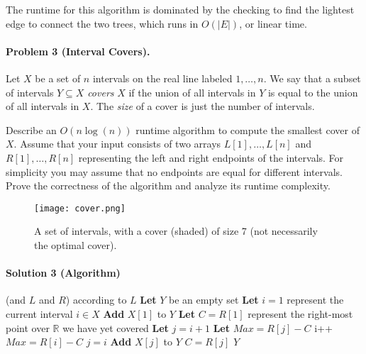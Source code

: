 \documentclass[11pt]{article}
\begin{document}
The runtime for this algorithm is dominated by the checking to find the lightest
edge to connect the two trees, which runs in $O(|E|)$, or linear time.


\newpage
\paragraph{Problem 3 (Interval Covers).} Let \(X\) be a set of \(n\) intervals on the real line labeled $1, \dots, n$. We say that a subset of intervals \(Y \subseteq X\) \textit{covers} \(X\) if the union of all intervals in \(Y\) is equal to the union of all intervals in \(X\). The \textit{size} of a cover is just the number of intervals.

Describe an $O(n \log(n))$ runtime algorithm to compute the smallest cover of \(X\). Assume that your input consists of two arrays \(L[1], \dots, L[n]\) and \(R[1],\dots, R[n]\) representing the left and right endpoints of the intervals. For simplicity you may assume that no endpoints are equal for different intervals. Prove the correctness of the algorithm and analyze its runtime complexity.

\begin{figure}[h]
\centering
\texttt{[image: cover.png]}
\caption{A set of intervals, with a cover (shaded) of size 7 (not necessarily the optimal cover).}
\end{figure}

\paragraph{Solution 3 (Algorithm)}

\begin{algorithmic}[1]
    \State {} (and $L$ and $R$) according to $L$ 
    \State \textbf{Let} $Y$ be an empty set
    \State \textbf{Let} $i = 1$ represent the current interval $i \in X$
    \State \textbf{Add} $X[1]$ to $Y$
    \State \textbf{Let} $C = R[1]$ represent the right-most point over $\mathbb{R}$ we have yet covered
        \State \textbf{Let} $j = i + 1$ 
        \State \textbf{Let} $Max = R[j] - C$ 
            \State i++
                \State $Max = R[i] - C$
                \State $j = i$
            \EndIf
        \EndWhile
        \State \textbf{Add} $X[j]$ to $Y$
        \State $C = R[j]$ 
    \EndWhile
    \State \Return $Y$
    \EndProcedure
\end{algorithmic}
\end{document}
